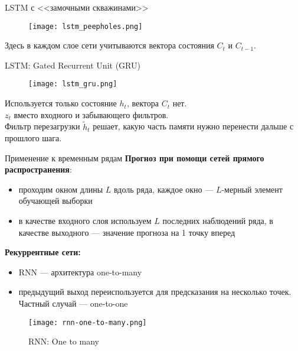 \documentclass[unicode,9pt, pdf]{beamer}
\begin{document}
	\begin{frame}{LSTM с <<замочными скважинами>>}
	    \begin{figure}[h]
	        \begin{center}
		        \texttt{[image: lstm\_peepholes.png]}
	        \end{center}
        \end{figure}
        Здесь в каждом слое сети учитываются вектора состояния $C_t$ и $C_{t-1}$.
	\end{frame}
	
\begin{frame}{LSTM: Gated Recurrent Unit (GRU)}
    \begin{figure}[h]
	        \begin{center}
		        \texttt{[image: lstm\_gru.png]}
	        \end{center}
        \end{figure}
        Используется только состояние $h_t$, вектора $C_t$ нет. \\
        $z_t$ вместо входного и забывающего фильтров.\\
        Фильтр перезагрузки $\widetilde{h}_t$ решает, какую часть памяти нужно перенести дальше с прошлого шага.\\
        
\end{frame}

\begin{frame}{Применение к временным рядам}
    \textbf{Прогноз при помощи сетей прямого распространения}:
        \begin{itemize}
            \item проходим окном длины $L$ вдоль ряда, каждое окно --- $L$-мерный элемент обучающей выборки
            \item в качестве входного слоя используем $L$ последних наблюдений ряда, в качестве выходного --- значение прогноза на 1 точку вперед
        \end{itemize}
    \textbf{Рекуррентные сети:}
    \begin{itemize}
        \item RNN --- архитектура one-to-many  
        \item предыдущий выход переиспользуется для предсказания на несколько точек. Частный случай --- one-to-one
    \end{itemize}
    \begin{figure}
        \centering
        \texttt{[image: rnn-one-to-many.png]}
        \caption{RNN: One to many}
        \label{fig:my_label}
    \end{figure}
\end{frame}
\end{document}
